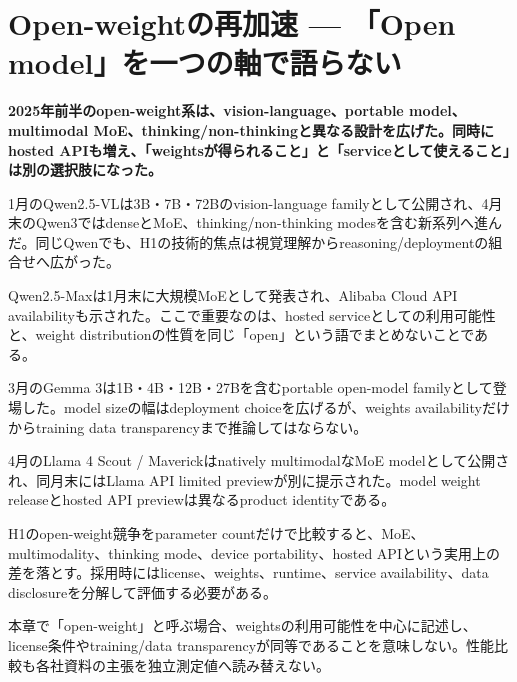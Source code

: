 \section{Open-weightの再加速 — 「Open model」を一つの軸で語らない}
\noindent\textbf{2025年前半のopen-weight系は、vision-language、portable model、multimodal MoE、thinking/non-thinkingと異なる設計を広げた。同時にhosted APIも増え、「weightsが得られること」と「serviceとして使えること」は別の選択肢になった。}\autocite{src-05f285e9757b,src-1bb16d7254b1,src-3e4a3f3b3d83,src-dc21f366b638}

1月のQwen2.5-VLは3B・7B・72Bのvision-language familyとして公開され、4月末のQwen3ではdenseとMoE、thinking/non-thinking modesを含む新系列へ進んだ。同じQwenでも、H1の技術的焦点は視覚理解からreasoning/deploymentの組合せへ広がった。\autocite{src-3e4a3f3b3d83,src-dc21f366b638}


Qwen2.5-Maxは1月末に大規模MoEとして発表され、Alibaba Cloud API availabilityも示された。ここで重要なのは、hosted serviceとしての利用可能性と、weight distributionの性質を同じ「open」という語でまとめないことである。\autocite{src-8c485019ad8d}


3月のGemma 3は1B・4B・12B・27Bを含むportable open-model familyとして登場した。model sizeの幅はdeployment choiceを広げるが、weights availabilityだけからtraining data transparencyまで推論してはならない。\autocite{src-1bb16d7254b1}


4月のLlama 4 Scout / Maverickはnatively multimodalなMoE modelとして公開され、同月末にはLlama API limited previewが別に提示された。model weight releaseとhosted API previewは異なるproduct identityである。\autocite{src-05f285e9757b,src-fca961b24baf}


H1のopen-weight競争をparameter countだけで比較すると、MoE、multimodality、thinking mode、device portability、hosted APIという実用上の差を落とす。採用時にはlicense、weights、runtime、service availability、data disclosureを分解して評価する必要がある。\autocite{src-05f285e9757b,src-1bb16d7254b1,src-3e4a3f3b3d83}


\begin{claimboundary}
本章で「open-weight」と呼ぶ場合、weightsの利用可能性を中心に記述し、license条件やtraining/data transparencyが同等であることを意味しない。性能比較も各社資料の主張を独立測定値へ読み替えない。
\end{claimboundary}
